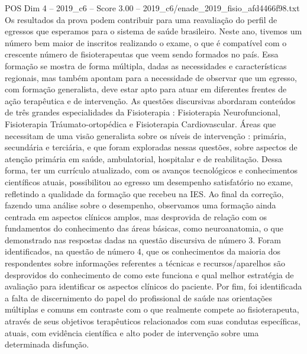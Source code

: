 \begin{textsample}{POS Dim 4 – 2019\_c6 – Score 3.00 – 2019\_c6/enade\_2019\_fisio\_afd4466f98.txt}
Os resultados da prova podem contribuir para uma reavaliação do perfil de egressos que esperamos para o sistema de saúde brasileiro.
Neste ano, tivemos um número bem maior de inscritos realizando o exame, o que é compatível com o crescente número de fisioterapeutas que veem sendo formados no país.
Essa formação se mostra de forma múltipla, dadas as necessidades e características regionais, mas também apontam para a necessidade de observar que um egresso, com formação generalista, deve estar apto para atuar em diferentes frentes de ação terapêutica e de intervenção.
As questões discursivas abordaram conteúdos de três grandes especialidades da Fisioterapia : Fisioterapia Neurofuncional, Fisioterapia Tráumato-ortopédica e Fisioterapia Cardiovascular.
Áreas que necessitam de uma visão generalista sobre os níveis de intervenção : primária, secundária e terciária, e que foram exploradas nessas questões, sobre aspectos de atenção primária em saúde, ambulatorial, hospitalar e de reabilitação.
Dessa forma, ter um currículo atualizado, com os avanços tecnológicos e conhecimentos científicos atuais, possibilitou ao egresso um desempenho satisfatório no exame, refletindo a qualidade da formação que recebeu na IES.
Ao final da correção, fazendo uma análise sobre o desempenho, observamos uma formação ainda centrada em aspectos clínicos amplos, mas desprovida de relação com os fundamentos do conhecimento das áreas básicas, como neuroanatomia, o que demonstrado nas respostas dadas na questão discursiva de número 3.
Foram identificados, na questão de número 4, que os conhecimentos da maioria dos respondentes sobre informações referentes a técnicas e recursos/aparelhos são desprovidos do conhecimento de como este funciona e qual melhor estratégia de avaliação para identificar os aspectos clínicos do paciente.
Por fim, foi identificada a falta de discernimento do papel do profissional de saúde nas orientações múltiplas e comuns em contraste com o que realmente compete ao fisioterapeuta, através de seus objetivos terapêuticos relacionados com suas condutas específicas, atuais, com evidência científica e alto poder de intervenção sobre uma determinada disfunção.

\end{textsample}
